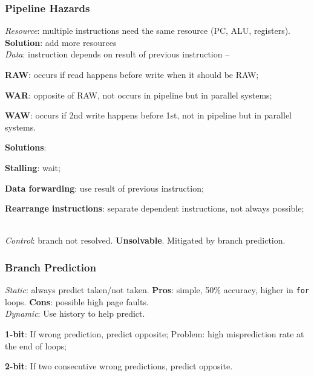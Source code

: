 \subsubsection*{Pipeline Hazards}
\emph{Resource}: multiple instructions need the same resource (PC, ALU, registers).
\textbf{Solution}: add more resources\\
\emph{Data}: instruction depends on result of previous instruction -- \begin{enuminline}
    \item \textbf{RAW}: occurs if read happens before write when it should be RAW;
    \item \textbf{WAR}: opposite of RAW, not occurs in pipeline but in parallel systems;
    \item \textbf{WAW}: occurs if 2nd write happens before 1st, not in pipeline but in parallel systems.
\end{enuminline}
\textbf{Solutions}: \begin{enuminline}
    \item \textbf{Stalling}: wait;
    \item \textbf{Data forwarding}: use result of previous instruction;
    \item \textbf{Rearrange instructions}: separate dependent instructions, not always possible;
\end{enuminline}\\
\emph{Control}: branch not resolved. \textbf{Unsolvable}. Mitigated by branch prediction.

\subsubsection*{Branch Prediction}
\emph{Static}: always predict taken/not taken.
\textbf{Pros}: simple, 50\% accuracy, higher in \texttt{for} loops.
\textbf{Cons}: possible high page faults.\\
\emph{Dynamic}: Use history to help predict. \begin{enuminline}
    \item \textbf{1-bit}: If wrong prediction, predict opposite; Problem: high misprediction rate at the end of loops;
    \item \textbf{2-bit}: If two consecutive wrong predictions, predict opposite.
\end{enuminline}